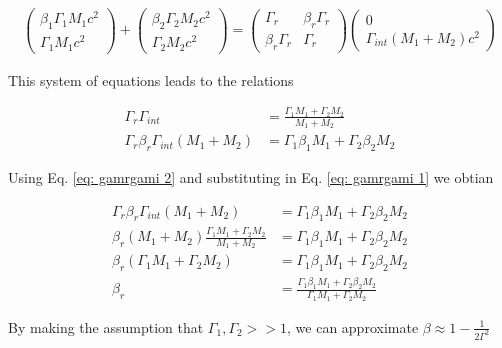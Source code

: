 \documentclass[linenumbers,twocolumn]{aastex631}
\begin{document}
\begin{appendix}
\begin{align}
	\begin{pmatrix}
	\beta_1\Gamma_1 M_1 c^2\\
	\Gamma_1 M_1 c^2
	\end{pmatrix}
	+
	\begin{pmatrix}
	\beta_2\Gamma_2 M_2 c^2 \\
	\Gamma_2 M_2 c^2
	\end{pmatrix}
	=
	\begin{pmatrix}
	\Gamma_r & \beta_r\Gamma_r\\
	\beta_r\Gamma_r & \Gamma_r
	\end{pmatrix}
	\begin{pmatrix}
	0 \\
	\Gamma_{int}(M_1 + M_2) c^2
	\end{pmatrix}
\end{align}

This system of equations leads to the relations

\begin{align}
	\Gamma_r \Gamma_{int} &= \frac{\Gamma_1M_1 + \Gamma_2M_2}{M_1+M_2} \label{eq: gamrgami 1}\\
	\Gamma_r\beta_r\Gamma_{int}(M_1+M_2) &= \Gamma_1\beta_1M_1+\Gamma_2\beta_2M_2 \label{eq: gamrgami 2}
\end{align}

Using Eq. \ref{eq: gamrgami 2} and substituting in Eq. \ref{eq: gamrgami 1} we obtian

\begin{align}
	\Gamma_r\beta_r\Gamma_{int}(M_1+M_2) &= \Gamma_1\beta_1M_1+\Gamma_2\beta_2M_2 \\
	\beta_r(M_1+M_2) \frac{\Gamma_1M_1 + \Gamma_2M_2}{M_1+M_2} &= \Gamma_1\beta_1M_1+\Gamma_2\beta_2M_2 \\
	\beta_r (\Gamma_1M_1 + \Gamma_2M_2) &= \Gamma_1\beta_1M_1+\Gamma_2\beta_2M_2 \\
	\beta_r &= \frac{\Gamma_1\beta_1M_1+\Gamma_2\beta_2M_2}{\Gamma_1M_1 + \Gamma_2M_2}
\end{align}

By making the assumption that $\Gamma_1, \Gamma_2 >> 1$, we can approximate $\beta \approx 1-\frac{1}{2\Gamma^2}$


\end{appendix}
\end{document}
